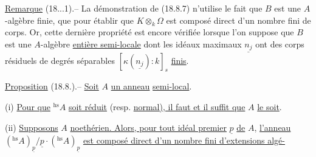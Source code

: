 \uline{Remarque} (18...1).-- La démonstration de (18.8.7) n'utilise le fait que $B$ est une $A$-algèbre finie, que pour établir que $K\otimes_k\Omega$ est composé direct d'un nombre fini de corps. Or, cette dernière propriété est encore vérifiée lorsque l'on suppose que $B$ est une $A$-algèbre \uline{entière semi-locale} dont les idéaux maximaux $\underline{n_j}$ ont des corps résiduels de degrés séparables $[\kappa(\underline{n_j}):k]_s$ \uline{finis}.

\uline{Proposition} (18.8.).-- \uline{Soit} $A$ \uline{un anneau}  \uline{semi-local}.

(i) \uline{Pour que} ${}^{\mathrm{hs}}A$ \uline{soit réduit} (resp. \uline{normal), il faut et il suffit que} $A$ \uline{le soit}.

(ii) \uline{Supposons} $A$ \uline{noethérien. Alors, pour tout idéal premier} $\underline p$ \uline{de} $A$, \uline{l'anneau} $({}^{\mathrm{hs}}A)_{\underline p}/\underline p\cdot({}^{\mathrm{hs}}A)_{\underline p}$ \uline{est composé direct d'un nombre fini d'extensions algé-}

